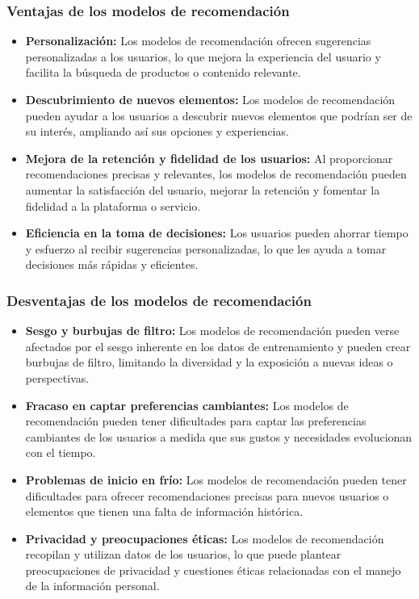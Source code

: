 \subsubsection{Ventajas de los modelos de recomendación}
\begin{itemize}
        \item \textbf{Personalización:} Los modelos de recomendación ofrecen sugerencias personalizadas a los usuarios, lo que mejora la experiencia del usuario y facilita la búsqueda de productos o contenido relevante.
        \item \textbf{Descubrimiento de nuevos elementos:} Los modelos de recomendación pueden ayudar a los usuarios a descubrir nuevos elementos que podrían ser de su interés, ampliando así sus opciones y experiencias.
        \item \textbf{Mejora de la retención y fidelidad de los usuarios:} Al proporcionar recomendaciones precisas y relevantes, los modelos de recomendación pueden aumentar la satisfacción del usuario, mejorar la retención y fomentar la fidelidad a la plataforma o servicio.
        \item \textbf{Eficiencia en la toma de decisiones:} Los usuarios pueden ahorrar tiempo y esfuerzo al recibir sugerencias personalizadas, lo que les ayuda a tomar decisiones más rápidas y eficientes.
\end{itemize}

\subsubsection{Desventajas de los modelos de recomendación}
\begin{itemize}
        \item \textbf{Sesgo y burbujas de filtro:} Los modelos de recomendación pueden verse afectados por el sesgo inherente en los datos de entrenamiento y pueden crear burbujas de filtro, limitando la diversidad y la exposición a nuevas ideas o perspectivas.
        \item \textbf{Fracaso en captar preferencias cambiantes:} Los modelos de recomendación pueden tener dificultades para captar las preferencias cambiantes de los usuarios a medida que sus gustos y necesidades evolucionan con el tiempo.
        \item \textbf{Problemas de inicio en frío:} Los modelos de recomendación pueden tener dificultades para ofrecer recomendaciones precisas para nuevos usuarios o elementos que tienen una falta de información histórica.
        \item \textbf{Privacidad y preocupaciones éticas:} Los modelos de recomendación recopilan y utilizan datos de los usuarios, lo que puede plantear preocupaciones de privacidad y cuestiones éticas relacionadas con el manejo de la información personal.    
\end{itemize}
